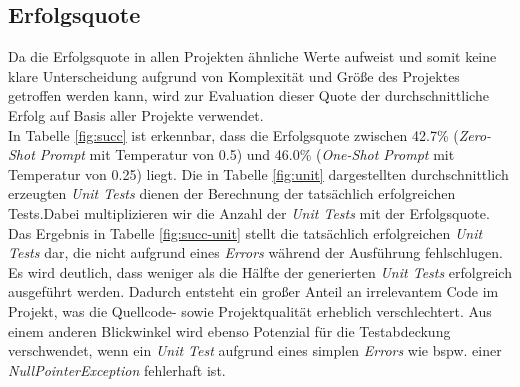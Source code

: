 \subsection{Erfolgsquote}
Da die Erfolgsquote in allen Projekten ähnliche Werte aufweist und somit keine klare Unterscheidung aufgrund von Komplexität und Größe des Projektes getroffen werden kann, wird zur Evaluation dieser Quote der durchschnittliche Erfolg auf Basis aller Projekte verwendet.\\
In Tabelle \ref{fig:succ} ist erkennbar, dass die Erfolgsquote zwischen 42.7\% (\textit{Zero-Shot Prompt} mit Temperatur von 0.5) und 46.0\% (\textit{One-Shot Prompt} mit Temperatur von 0.25) liegt. Die in Tabelle \ref{fig:unit} dargestellten durchschnittlich erzeugten \textit{Unit Tests} dienen der Berechnung der tatsächlich erfolgreichen Tests.Dabei multiplizieren wir die Anzahl der \textit{Unit Tests} mit der Erfolgsquote. Das Ergebnis in Tabelle \ref{fig:succ-unit} stellt die tatsächlich erfolgreichen  \textit{Unit Tests} dar, die nicht aufgrund eines \textit{Errors} während der Ausführung fehlschlugen.  Es wird deutlich, dass weniger als die Hälfte der generierten  \textit{Unit Tests} erfolgreich ausgeführt werden. Dadurch entsteht ein großer Anteil an irrelevantem Code im Projekt, was die Quellcode- sowie Projektqualität erheblich verschlechtert. Aus einem anderen Blickwinkel wird ebenso Potenzial für die Testabdeckung verschwendet, wenn ein  \textit{Unit Test} aufgrund eines simplen \textit{Errors} wie bspw. einer \textit{NullPointerException} fehlerhaft ist.


